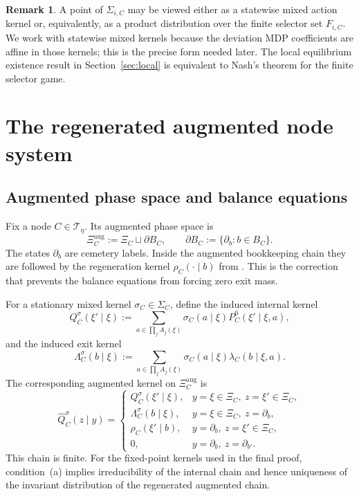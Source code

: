 \documentclass[12pt]{article}
\theoremstyle{definition}
\newtheorem{remark}[theorem]{Remark}
\newcommand{\1}{\mathbf{1}}
\newcommand{\cT}{\mathcal{T}}
\begin{document}
\begin{remark}
A point of $\Sigma_{i,C}$ may be viewed either as a statewise mixed action kernel
or, equivalently, as a product distribution over the finite selector set
$F_{i,C}$.  We work with statewise mixed kernels because the deviation MDP
coefficients are affine in those kernels; this is the precise form needed later.
The local equilibrium existence result in Section~\ref{sec:local} is equivalent to
Nash's theorem for the finite selector game.
\end{remark}

\section{The regenerated augmented node system}
\label{sec:augmented}

\subsection{Augmented phase space and balance equations}

Fix a node $C\in\cT_\eta$.  Its augmented phase space is
\[
\Xi_C^{\mathrm{aug}}:=\Xi_C\sqcup \partial B_C,
\qquad
\partial B_C:=\{\partial_b:b\in B_C\}.
\]
The states $\partial_b$ are cemetery labels.  Inside the augmented bookkeeping
chain they are followed by the regeneration kernel $\rho_C(\cdot\mid b)$ from
.  This is the correction that prevents the balance equations
from forcing zero exit mass.

For a stationary mixed kernel $\sigma_C\in\Sigma_C$, define the induced internal
kernel
\[
Q_C^{\sigma}(\xi'\mid \xi)
:=
\sum_{a\in\prod_j A_j(\xi)} \sigma_C(a\mid \xi)
P_C^0(\xi'\mid \xi,a),
\]
and the induced exit kernel
\[
\Lambda_C^{\sigma}(b\mid\xi)
:=
\sum_{a\in\prod_j A_j(\xi)}\sigma_C(a\mid\xi)\lambda_C(b\mid\xi,a).
\]
The corresponding augmented kernel on $\Xi_C^{\mathrm{aug}}$ is
\begin{equation}
\label{eq:aug-kernel}
\widehat Q_C^{\sigma}(z\mid y)
=
\begin{cases}
Q_C^{\sigma}(\xi'\mid \xi), & y=\xi\in\Xi_C,\ z=\xi'\in\Xi_C,\\[0.3em]
\Lambda_C^{\sigma}(b\mid \xi), & y=\xi\in\Xi_C,\ z=\partial_b,\\[0.3em]
\rho_C(\xi'\mid b), & y=\partial_b,\ z=\xi'\in\Xi_C,\\[0.3em]
0, & y=\partial_b,\ z=\partial_{b'}.
\end{cases}
\end{equation}
This chain is finite.  For the fixed-point kernels used in the final proof,
condition~\textnormal{(a)} implies irreducibility of the internal chain and hence
uniqueness of the invariant distribution of the regenerated augmented chain.
\end{document}
